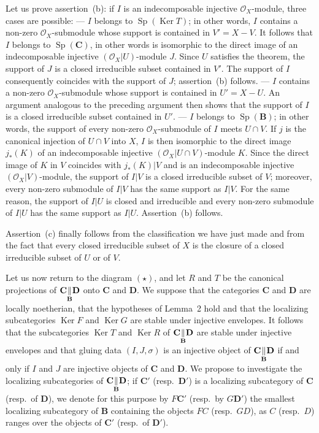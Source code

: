 Let us prove assertion~(b): if $I$ is an indecomposable injective
$\mathcal{O}_X$-module, three cases are possible:
--- $I$ belongs to $\operatorname{Sp}(\operatorname{Ker} T)$; in other
words, $I$ contains a non-zero $\mathcal{O}_X$-submodule whose support
is contained in $V' = X - V$. It follows that $I$ belongs to
$\operatorname{Sp}(\mathbf{C})$, in other words is isomorphic to the
direct image of an indecomposable injective $(\mathcal{O}_X|U)$-module
$J$. Since $U$ satisfies the theorem, the support of $J$ is a closed
irreducible subset contained in $V'$. The support of $I$ consequently
coincides with the support of $J$; assertion~(b) follows.
--- $I$ contains a non-zero $\mathcal{O}_X$-submodule whose support is
contained in $U' = X - U$. An argument analogous to the preceding
argument then shows that the support of $I$ is a closed irreducible
subset contained in $U'$.
--- $I$ belongs to $\operatorname{Sp}(\mathbf{B})$; in other words, the
support of every non-zero $\mathcal{O}_X$-submodule of $I$ meets
$U \cap V$. If $j$ is the canonical injection of $U \cap V$ into $X$,
$I$ is then isomorphic to the direct image $j_*(K)$ of an
indecomposable injective $(\mathcal{O}_X|U \cap V)$-module $K$. Since the
direct image of $K$ in $V$ coincides with $j_*(K)|V$ and is an
indecomposable injective $(\mathcal{O}_X|V)$-module, the support of
$I|V$ is a closed irreducible subset of $V$; moreover, every non-zero
submodule of $I|V$ has the same support as $I|V$. For the same reason,
the support of $I|U$ is closed and irreducible and every non-zero
submodule of $I|U$ has the same support as $I|U$. Assertion~(b) follows.

Assertion~(c) finally follows from the classification we have just made
and from the fact that every closed irreducible subset of $X$ is the
closure of a closed irreducible subset of $U$ or of $V$.

Let us now return to the diagram $(\star)$, and let $R$ and $T$ be the
canonical projections of
$\mathbf{C} \underset{\mathbf{B}}{\Vert} \mathbf{D}$ onto $\mathbf{C}$ and
$\mathbf{D}$. We suppose that the categories $\mathbf{C}$ and
$\mathbf{D}$ are locally noetherian, that the hypotheses of Lemma~2
hold and that the localizing subcategories $\operatorname{Ker} F$ and
$\operatorname{Ker} G$ are stable under injective envelopes. It follows
that the subcategories $\operatorname{Ker} T$ and
$\operatorname{Ker} R$ of
$\mathbf{C} \underset{\mathbf{B}}{\Vert} \mathbf{D}$ are stable under
injective envelopes and that gluing data $(I, J, \sigma)$ is an
injective object of
$\mathbf{C} \underset{\mathbf{B}}{\Vert} \mathbf{D}$ if and only if $I$ and
$J$ are injective objects of $\mathbf{C}$ and $\mathbf{D}$. We propose
to investigate the localizing subcategories of
$\mathbf{C} \underset{\mathbf{B}}{\Vert} \mathbf{D}$; if $\mathbf{C}'$
(resp.\ $\mathbf{D}'$) is a localizing subcategory of $\mathbf{C}$
(resp.\ of $\mathbf{D}$), we denote for this purpose by $F\mathbf{C}'$
(resp.\ by $G\mathbf{D}'$) the smallest localizing subcategory of
$\mathbf{B}$ containing the objects $FC$ (resp.\ $GD$), as $C$
(resp.\ $D$) ranges over the objects of $\mathbf{C}'$ (resp.\ of
$\mathbf{D}'$).

